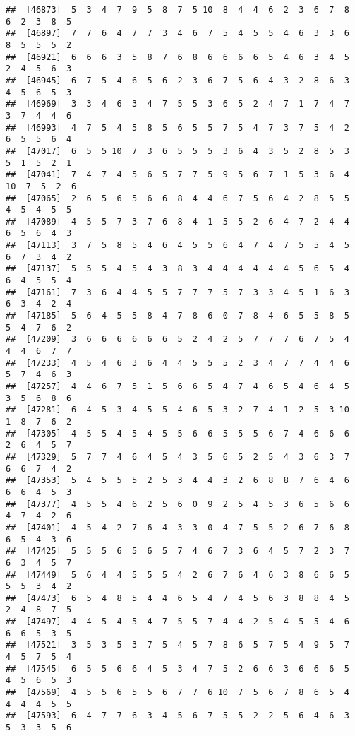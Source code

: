\documentclass[
]{book}
\begin{document}
\begin{verbatim}
##  [46873]  5  3  4  7  9  5  8  7  5 10  8  4  4  6  2  3  6  7  8  6  2  3  8  5
##  [46897]  7  7  6  4  7  7  3  4  6  7  5  4  5  5  4  6  3  3  6  8  5  5  5  2
##  [46921]  6  6  6  3  5  8  7  6  8  6  6  6  6  5  4  6  3  4  5  2  4  5  6  3
##  [46945]  6  7  5  4  6  5  6  2  3  6  7  5  6  4  3  2  8  6  3  4  5  6  5  3
##  [46969]  3  3  4  6  3  4  7  5  5  3  6  5  2  4  7  1  7  4  7  3  7  4  4  6
##  [46993]  4  7  5  4  5  8  5  6  5  5  7  5  4  7  3  7  5  4  2  6  5  5  6  4
##  [47017]  6  5  5 10  7  3  6  5  5  5  3  6  4  3  5  2  8  5  3  5  1  5  2  1
##  [47041]  7  4  7  4  5  6  5  7  7  5  9  5  6  7  1  5  3  6  4 10  7  5  2  6
##  [47065]  2  6  5  6  5  6  6  8  4  4  6  7  5  6  4  2  8  5  5  4  5  4  5  5
##  [47089]  4  5  5  7  3  7  6  8  4  1  5  5  2  6  4  7  2  4  4  6  5  6  4  3
##  [47113]  3  7  5  8  5  4  6  4  5  5  6  4  7  4  7  5  5  4  5  6  7  3  4  2
##  [47137]  5  5  5  4  5  4  3  8  3  4  4  4  4  4  4  5  6  5  4  6  4  5  5  4
##  [47161]  7  3  6  4  4  5  5  7  7  7  5  7  3  3  4  5  1  6  3  6  3  4  2  4
##  [47185]  5  6  4  5  5  8  4  7  8  6  0  7  8  4  6  5  5  8  5  5  4  7  6  2
##  [47209]  3  6  6  6  6  6  6  5  2  4  2  5  7  7  7  6  7  5  4  4  4  6  7  7
##  [47233]  4  5  4  6  3  6  4  4  5  5  5  2  3  4  7  7  4  4  6  5  7  4  6  3
##  [47257]  4  4  6  7  5  1  5  6  6  5  4  7  4  6  5  4  6  4  5  3  5  6  8  6
##  [47281]  6  4  5  3  4  5  5  4  6  5  3  2  7  4  1  2  5  3 10  1  8  7  6  2
##  [47305]  4  5  5  4  5  4  5  5  6  6  5  5  5  6  7  4  6  6  6  2  6  4  5  7
##  [47329]  5  7  7  4  6  4  5  4  3  5  6  5  2  5  4  3  6  3  7  6  6  7  4  2
##  [47353]  5  4  5  5  5  2  5  3  4  4  3  2  6  8  8  7  6  4  6  6  6  4  5  3
##  [47377]  4  5  5  4  6  2  5  6  0  9  2  5  4  5  3  6  5  6  6  4  7  4  2  6
##  [47401]  4  5  4  2  7  6  4  3  3  0  4  7  5  5  2  6  7  6  8  6  5  4  3  6
##  [47425]  5  5  5  6  5  6  5  7  4  6  7  3  6  4  5  7  2  3  7  6  3  4  5  7
##  [47449]  5  6  4  4  5  5  5  4  2  6  7  6  4  6  3  8  6  6  5  5  5  3  4  2
##  [47473]  6  5  4  8  5  4  4  6  5  4  7  4  5  6  3  8  8  4  5  2  4  8  7  5
##  [47497]  4  4  5  4  5  4  7  5  5  7  4  4  2  5  4  5  5  4  6  6  6  5  3  5
##  [47521]  3  5  3  5  3  7  5  4  5  7  8  6  5  7  5  4  9  5  7  4  5  7  5  4
##  [47545]  6  5  5  6  6  4  5  3  4  7  5  2  6  6  3  6  6  6  5  4  5  6  5  3
##  [47569]  4  5  5  6  5  5  6  7  7  6 10  7  5  6  7  8  6  5  4  4  4  4  5  5
##  [47593]  6  4  7  7  6  3  4  5  6  7  5  5  2  2  5  6  4  6  3  5  3  3  5  6

\end{verbatim}
\end{document}
